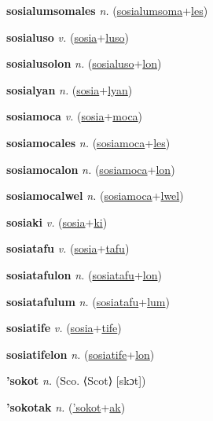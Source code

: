\textbf{\hypertarget{sosialumsomales}{sosialumsomales}} \textit{n.} (\hyperlink{sosialumsoma}{sosialumsoma}+\allowbreak \hyperlink{les}{les})


\textbf{\hypertarget{sosialuso}{sosialuso}} \textit{v.} (\hyperlink{sosia}{sosia}+\allowbreak \hyperlink{luso}{luso})


\textbf{\hypertarget{sosialusolon}{sosialusolon}} \textit{n.} (\hyperlink{sosialuso}{sosialuso}+\allowbreak \hyperlink{lon}{lon})


\textbf{\hypertarget{sosialyan}{sosialyan}} \textit{n.} (\hyperlink{sosia}{sosia}+\allowbreak \hyperlink{lyan}{lyan})


\textbf{\hypertarget{sosiamoca}{sosiamoca}} \textit{v.} (\hyperlink{sosia}{sosia}+\allowbreak \hyperlink{moca}{moca})


\textbf{\hypertarget{sosiamocales}{sosiamocales}} \textit{n.} (\hyperlink{sosiamoca}{sosiamoca}+\allowbreak \hyperlink{les}{les})


\textbf{\hypertarget{sosiamocalon}{sosiamocalon}} \textit{n.} (\hyperlink{sosiamoca}{sosiamoca}+\allowbreak \hyperlink{lon}{lon})


\textbf{\hypertarget{sosiamocalwel}{sosiamocalwel}} \textit{n.} (\hyperlink{sosiamoca}{sosiamoca}+\allowbreak \hyperlink{lwel}{lwel})


\textbf{\hypertarget{sosiaki}{sosiaki}} \textit{v.} (\hyperlink{sosia}{sosia}+\allowbreak \hyperlink{ki}{ki})


\textbf{\hypertarget{sosiatafu}{sosiatafu}} \textit{v.} (\hyperlink{sosia}{sosia}+\allowbreak \hyperlink{tafu}{tafu})


\textbf{\hypertarget{sosiatafulon}{sosiatafulon}} \textit{n.} (\hyperlink{sosiatafu}{sosiatafu}+\allowbreak \hyperlink{lon}{lon})


\textbf{\hypertarget{sosiatafulum}{sosiatafulum}} \textit{n.} (\hyperlink{sosiatafu}{sosiatafu}+\allowbreak \hyperlink{lum}{lum})


\textbf{\hypertarget{sosiatife}{sosiatife}} \textit{v.} (\hyperlink{sosia}{sosia}+\allowbreak \hyperlink{tife}{tife})


\textbf{\hypertarget{sosiatifelon}{sosiatifelon}} \textit{n.} (\hyperlink{sosiatife}{sosiatife}+\allowbreak \hyperlink{lon}{lon})


\textbf{\hypertarget{'sokot}{'sokot}} \textit{n.} (Sco. ⟨Scot⟩ [skɔt])


\textbf{\hypertarget{'sokotak}{'sokotak}} \textit{n.} (\hyperlink{'sokot}{'sokot}+\allowbreak \hyperlink{ak}{ak})


